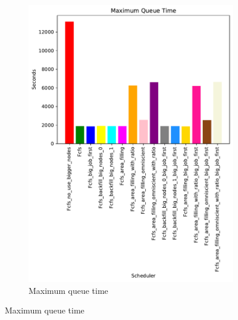 \documentclass[a4paper]{article}
\begin{document}
\begin{figure}[H]
\begin{subfigure}[b]{0.4\linewidth}\centering\includegraphics[width=1\linewidth]{MBSS/plot/Size_Constraint_2022-01-24->2022-01-24_Maximum_queue_time_162_128_162_256_162_1024.pdf}\caption{Maximum queue time}\label{11}\end{subfigure}

\end{figure}
\end{document}
